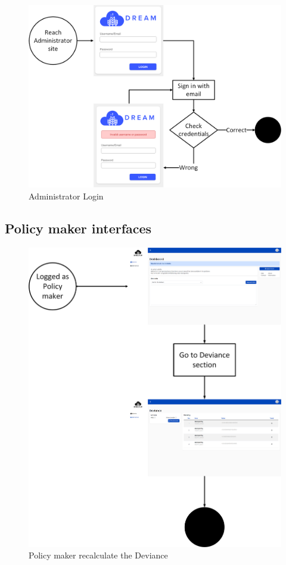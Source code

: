 \begin{figure}[h!]
        \centering
        \includegraphics[scale=0.35]{images/interfaces/administrator_login_interface.png}
        \caption{Administrator Login}
        \label{fig:administrator_login_interface}
\end{figure}
\FloatBarrier

\newpage
\subsection{Policy maker interfaces}

\begin{figure}[h!]
        \centering
        \includegraphics[scale=0.18]{images/interfaces/policy_maker_deviance_interface.png}
        \caption{Policy maker recalculate the Deviance}
        \label{fig:policy_maker_deviance_interface}
\end{figure}
\FloatBarrier

